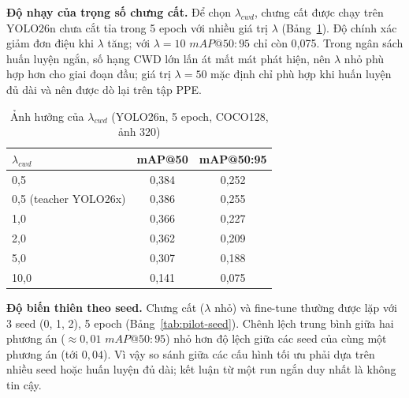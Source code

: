 \begin{table}[H]
\centering
\caption{Phục hồi độ chính xác sau cắt tỉa 30\% trên COCO128 (CPU, ảnh 320)}
\label{tab:pilot-recovery}
\end{table}

\textbf{Độ nhạy của trọng số chưng cất.} Để chọn $\lambda_{cwd}$, chưng cất được
chạy trên YOLO26n chưa cắt tỉa trong 5 epoch với nhiều giá trị $\lambda$
(Bảng~\ref{tab:pilot-lambda}). Độ chính xác giảm đơn điệu khi $\lambda$ tăng; với
$\lambda = 10$ $mAP@50{:}95$ chỉ còn 0,075. Trong ngân sách huấn luyện ngắn, số
hạng CWD lớn lấn át mất mát phát hiện, nên $\lambda$ nhỏ phù hợp hơn cho giai đoạn
đầu; giá trị $\lambda=50$ mặc định chỉ phù hợp khi huấn luyện đủ dài và nên được
dò lại trên tập PPE.

\begin{table}[H]
\centering
\caption{Ảnh hưởng của $\lambda_{cwd}$ (YOLO26n, 5 epoch, COCO128, ảnh 320)}
\label{tab:pilot-lambda}
\begin{tabular}{lcc}
\toprule
\textbf{$\lambda_{cwd}$} & \textbf{mAP@50} & \textbf{mAP@50:95}\\
\midrule
0,5 & 0,384 & 0,252\\
0,5 (teacher YOLO26x) & 0,386 & 0,255\\
1,0 & 0,366 & 0,227\\
2,0 & 0,362 & 0,209\\
5,0 & 0,307 & 0,188\\
10,0 & 0,141 & 0,075\\
\bottomrule
\end{tabular}
\end{table}

\textbf{Độ biến thiên theo seed.} Chưng cất ($\lambda$ nhỏ) và fine-tune thường
được lặp với 3 seed (0, 1, 2), 5 epoch (Bảng~\ref{tab:pilot-seed}). Chênh lệch
trung bình giữa hai phương án ($\approx 0{,}01$ $mAP@50{:}95$) nhỏ hơn độ lệch giữa
các seed của cùng một phương án (tới $0{,}04$). Vì vậy so sánh giữa các cấu hình
tối ưu phải dựa trên nhiều seed hoặc huấn luyện đủ dài; kết luận từ một run ngắn
duy nhất là không tin cậy.

